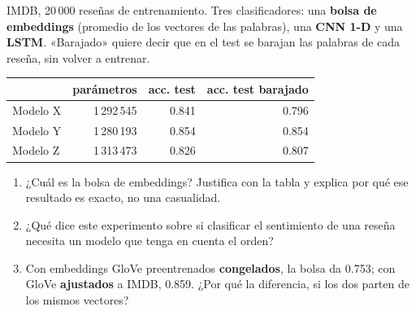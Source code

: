 \documentclass[10.5pt,a4paper]{article}
\newcommand{\resp}[1]{\par\vspace{#1}}
\newcommand{\preg}[1]{\vspace{4pt}{\large\bfseries #1}\par\vspace{3pt}}
\begin{document}
\newpage
\preg{3. Barajar las palabras}
IMDB, 20\,000 reseñas de entrenamiento. Tres clasificadores: una \textbf{bolsa de embeddings} (promedio de los vectores de las palabras), una \textbf{CNN 1-D} y una \textbf{LSTM}. «Barajado» quiere decir que en el test se barajan las palabras de cada reseña, sin volver a entrenar.\par\vspace{4pt}
\begin{center}
\begin{tabular}{lrrr}
\toprule
 & parámetros & acc. test & acc. test barajado \\
\midrule
Modelo X & 1\,292\,545 & 0.841 & 0.796 \\
Modelo Y & 1\,280\,193 & 0.854 & 0.854 \\
Modelo Z & 1\,313\,473 & 0.826 & 0.807 \\
\bottomrule
\end{tabular}
\end{center}
\begin{enumerate}
\item ¿Cuál es la bolsa de embeddings? Justifica con la tabla y explica por qué ese resultado es exacto, no una casualidad.\resp{2.0cm}
\item ¿Qué dice este experimento sobre si clasificar el sentimiento de una reseña necesita un modelo que tenga en cuenta el orden?\resp{2.0cm}
\item Con embeddings GloVe preentrenados \textbf{congelados}, la bolsa da 0.753; con GloVe \textbf{ajustados} a IMDB, 0.859. ¿Por qué la diferencia, si los dos parten de los mismos vectores?\resp{2.0cm}
\end{enumerate}
\end{document}
